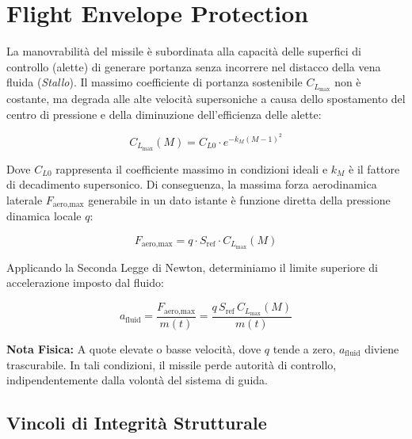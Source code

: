 \documentclass[12pt,a4paper]{article}
\begin{document}
\section{Flight Envelope Protection}

La manovrabilità del missile è subordinata alla capacità delle superfici di controllo (alette) di generare portanza senza incorrere nel distacco della vena fluida (\textit{Stallo}).
Il massimo coefficiente di portanza sostenibile $C_{L_{\max}}$ non è costante, ma degrada alle alte velocità supersoniche a causa dello spostamento del centro di pressione e della diminuzione dell'efficienza delle alette:

\begin{equation}
    C_{L_{\max}}(M) = C_{L0} \cdot e^{-k_M (M - 1)^2}
\end{equation}

Dove $C_{L0}$ rappresenta il coefficiente massimo in condizioni ideali e $k_M$ è il fattore di decadimento supersonico.
Di conseguenza, la massima forza aerodinamica laterale $F_{\text{aero,max}}$ generabile in un dato istante è funzione diretta della pressione dinamica locale $q$:

\begin{equation}
    F_{\text{aero,max}} = q \cdot S_{\text{ref}} \cdot C_{L_{\max}}(M) 
\end{equation}

Applicando la Seconda Legge di Newton, determiniamo il limite superiore di accelerazione imposto dal fluido:

\begin{equation}
    a_{\text{fluid}} = \frac{F_{\text{aero,max}}}{m(t)} = \frac{q \, S_{\text{ref}} \, C_{L_{\max}}(M)}{m(t)}
\end{equation}

\textbf{Nota Fisica:} A quote elevate o basse velocità, dove $q$ tende a zero, $a_{\text{fluid}}$ diviene trascurabile. In tali condizioni, il missile perde autorità di controllo, indipendentemente dalla volontà del sistema di guida.

\subsection{Vincoli di Integrità Strutturale}
\end{document}
